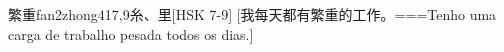 \begin{EntryWithPhonetic}{繁重}{fan2zhong4}{17,9}{⽷、⾥}[HSK 7-9]
  [我每天都有繁重的工作。===Tenho uma carga de trabalho pesada todos os dias.]
\end{EntryWithPhonetic}
